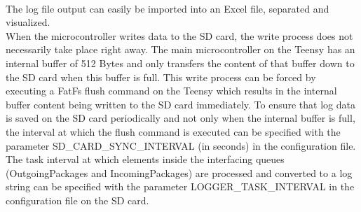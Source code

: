 \noindent{}
%
\\
The log file output can easily be imported into an Excel file, separated and visualized.\\
When the microcontroller writes data to the SD card, the write process does not necessarily take place right away. The main microcontroller on the Teensy has an internal buffer of 512 Bytes and only transfers the content of that buffer down to the SD card when this buffer is full. This write process can be forced by executing a FatFs flush command on the Teensy which results in the internal buffer content being written to the SD card immediately.
To ensure that log data is saved on the SD card periodically and not only when the internal buffer is full, the interval at which the flush command is executed can be specified with the parameter SD\_CARD\_SYNC\_INTERVAL (in seconds) in the configuration file.\\
The task interval at which elements inside the interfacing queues (OutgoingPackages and IncomingPackages) are processed and converted to a log string can be specified with the parameter LOGGER\_TASK\_INTERVAL in the configuration file on the SD card. 
%
